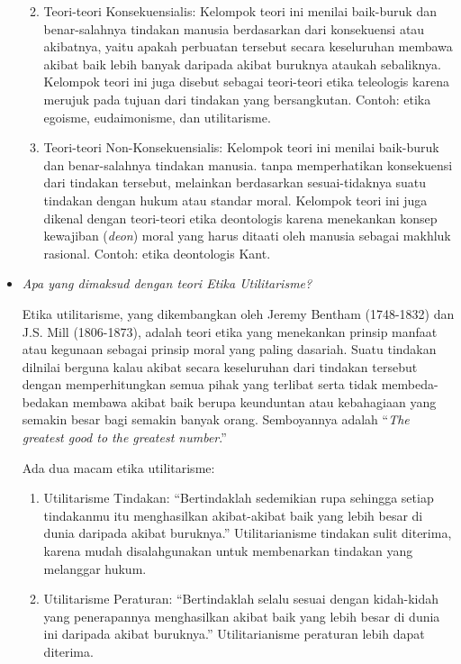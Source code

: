 \documentclass[10pt,a4paper]{article}
\def\tightlist{}
\begin{document}
\begin{multicols}{2}
\begin{itemize}
  \begin{enumerate}
  \def\labelenumi{\arabic{enumi}.}
  \tightlist
  \item
    Teori-teori Konsekuensialis: Kelompok teori ini menilai baik-buruk
    dan benar-salahnya tindakan manusia berdasarkan dari konsekuensi
    atau akibatnya, yaitu apakah perbuatan tersebut secara keseluruhan
    membawa akibat baik lebih banyak daripada akibat buruknya ataukah
    sebaliknya. Kelompok teori ini juga disebut sebagai teori-teori
    etika teleologis karena merujuk pada tujuan dari tindakan yang
    bersangkutan. Contoh: etika egoisme, eudaimonisme, dan utilitarisme.
  \item
    Teori-teori Non-Konsekuensialis: Kelompok teori ini menilai
    baik-buruk dan benar-salahnya tindakan manusia. tanpa memperhatikan
    konsekuensi dari tindakan tersebut, melainkan berdasarkan
    sesuai-tidaknya suatu tindakan dengan hukum atau standar moral.
    Kelompok teori ini juga dikenal dengan teori-teori etika deontologis
    karena menekankan konsep kewajiban (\emph{deon}) moral yang harus
    ditaati oleh manusia sebagai makhluk rasional. Contoh: etika
    deontologis Kant.
  \end{enumerate}
\item
  \emph{Apa yang dimaksud dengan teori Etika Utilitarisme?}

  Etika utilitarisme, yang dikembangkan oleh Jeremy Bentham (1748-1832)
  dan J.S. Mill (1806-1873), adalah teori etika yang menekankan prinsip
  manfaat atau kegunaan sebagai prinsip moral yang paling dasariah.
  Suatu tindakan dilnilai berguna kalau akibat secara keseluruhan dari
  tindakan tersebut dengan memperhitungkan semua pihak yang terlibat
  serta tidak membeda-bedakan membawa akibat baik berupa keunduntan atau
  kebahagiaan yang semakin besar bagi semakin banyak orang. Semboyannya
  adalah ``\emph{The greatest good to the greatest number}.''

  Ada dua macam etika utilitarisme:

  \begin{enumerate}
  \def\labelenumi{\arabic{enumi}.}
  \tightlist
  \item
    Utilitarisme Tindakan: ``Bertindaklah sedemikian rupa sehingga
    setiap tindakanmu itu menghasilkan akibat-akibat baik yang lebih
    besar di dunia daripada akibat buruknya.'' Utilitarianisme tindakan
    sulit diterima, karena mudah disalahgunakan untuk membenarkan
    tindakan yang melanggar hukum.
  \item
    Utilitarisme Peraturan: ``Bertindaklah selalu sesuai dengan
    kidah-kidah yang penerapannya menghasilkan akibat baik yang lebih
    besar di dunia ini daripada akibat buruknya.'' Utilitarianisme
    peraturan lebih dapat diterima.
  \end{enumerate}


\end{itemize}
\end{multicols}
\end{document}
